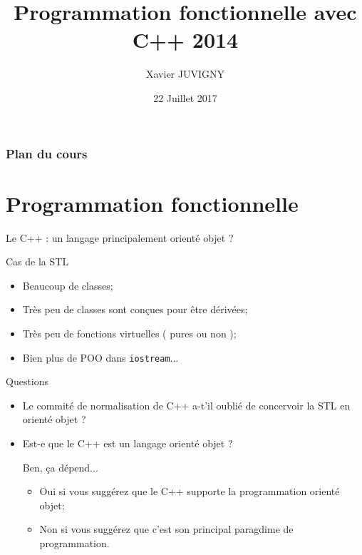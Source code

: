 \documentclass[handout,10pt]{beamer}
\title[C++\hspace{2em}]{Programmation fonctionnelle avec C++ 2014}
\author[Xavier JUVIGNY]{Xavier JUVIGNY}
\date{22 Juillet 2017}
\institute{ONERA}
\begin{document}

\begin{frame}
 \titlepage
\end{frame}

\begin{frame}
\frametitle{Plan du cours}
\tableofcontents
\end{frame}

\section{Programmation fonctionnelle}

\begin{frame}[fragile]{Le C++ : un langage principalement orienté objet ?}
\tiny
\begin{block}{Cas de la STL}
\begin{itemize}
\item Beaucoup de classes;
\item Très peu de classes sont conçues pour être dérivées;
\item Très peu de fonctions virtuelles ( pures ou non );
\item Bien plus de POO dans \lstinline$iostream$...
\end{itemize}
\end{block}
\begin{alertblock}{Questions}
\begin{itemize}
\item Le commité de normalisation de C++ a-t'il oublié de concervoir la STL en orienté objet ?
\item Est-e que le C++ est un langage orienté objet ?
\begin{exampleblock}{Ben, ça dépend...}
\begin{itemize}
\item Oui si vous suggérez que le C++ supporte la programmation orienté objet;
\item Non si vous suggérez que c'est son principal paragdime de programmation.
\end{itemize}
\end{exampleblock}
\end{itemize}
\end{alertblock}
\end{frame}
\end{document}

